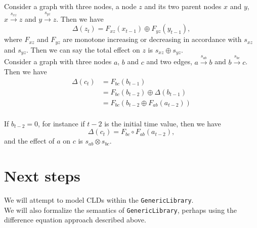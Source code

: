 \documentclass[a4paper,11pt]{article}
\begin{document}
Consider a graph with three nodes, a node $z$ and its two parent nodes $x$ and
$y$, $x\xrightarrow{s_{xz}} z$ and $y\xrightarrow{s_{yz}} z$. Then we have
\[\Delta(z_t) = F_{xz}(x_{t-1}) \oplus F_{yz}(y_{t-1}),\]
where $F_{xz}$ and $F_{yz}$ are monotone increasing or decreasing in accordance
with $s_{xz}$ and $s_{yz}$. Then we can say the total effect on $z$ is
$s_{xz}\oplus s_{yz}$.\\

Consider a graph with three nodes $a$, $b$ and $c$ and two edges,
$a\xrightarrow{s_{ab}} b$ and $b\xrightarrow{s_{bc}} c$. Then we have
\begin{align*}
\Delta(c_t) &= F_{bc}(b_{t-1})\\
&= F_{bc}(b_{t-2}) \oplus \Delta(b_{t-1})\\
&= F_{bc}(b_{t-2} \oplus F_{ab}(a_{t-2}))\\
\end{align*}

If $b_{t-2} = 0$, for instance if $t-2$ is the initial time value, then we have
\[\Delta(c_t) = F_{bc}\circ F_{ab}(a_{t-2}),\]
and the effect of $a$ on $c$ is $s_{ab}\otimes s_{bc}$.
\section{Next steps}
We will attempt to model CLDs within the \verb|GenericLibrary|.\\

We will also formalize the semantics of \verb|GenericLibrary|, perhaps using the difference
equation approach described above.
\end{document}
